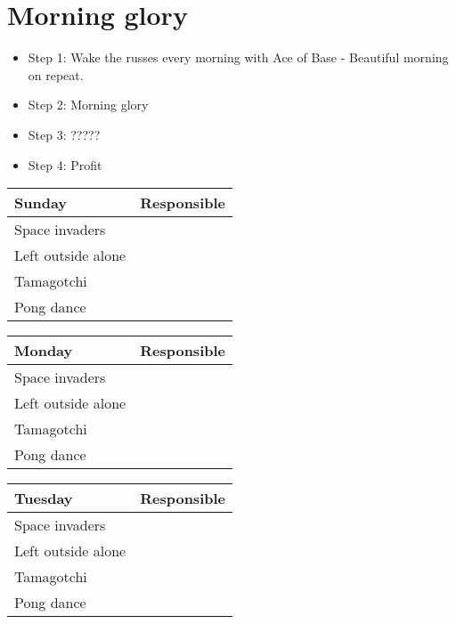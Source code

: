 \documentclass[../../main.tex]{subfiles}
\begin{document}
\section{Morning glory}
\begin{itemize}
    \item Step 1: Wake the russes every morning with Ace of Base - Beautiful morning on repeat.
    \item Step 2: Morning glory
    \item Step 3: ?????
    \item Step 4: Profit
\end{itemize}

\begin{center}
\begin{tabular}{|p{3cm}|p{7cm}|}
\hline \textbf{Sunday}      & \textbf{Responsible}    \\\hline
\hline  Space invaders      &     \\
\hline  Left outside alone  &     \\
\hline  Tamagotchi           &     \\
\hline  Pong dance          &     \\

\hline
\end{tabular}

\begin{tabular}{|p{3cm}|p{7cm}|}
\hline \textbf{Monday}      & \textbf{Responsible}    \\\hline
\hline  Space invaders      &     \\
\hline  Left outside alone  &     \\
\hline  Tamagotchi           &     \\
\hline  Pong dance          &     \\

\hline
\end{tabular}

\begin{tabular}{|p{3cm}|p{7cm}|}
\hline \textbf{Tuesday}      & \textbf{Responsible}    \\\hline
\hline  Space invaders      &     \\
\hline  Left outside alone  &     \\
\hline  Tamagotchi           &     \\
\hline  Pong dance          &     \\

\hline
\end{tabular}
\end{center}
\end{document}
